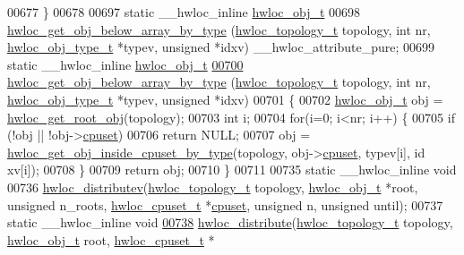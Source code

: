 \begin{DoxyCode}
00677 \}
00678 
00697 \textcolor{keyword}{static} \_\_hwloc\_inline \hyperlink{a00016}{hwloc_obj_t}
00698 \hyperlink{a00058_gac33a0990f4e771b2117ddedabc3f00f6}{hwloc_get_obj_below_array_by_type} (\hyperlink{a00039_ga9d1e76ee15a7dee158b786c30b6a6e38}{hwloc_topology_t} topology, \textcolor{keywordtype}{int} nr, 
      \hyperlink{a00041_gacd37bb612667dc437d66bfb175a8dc55}{hwloc_obj_type_t} *typev, \textcolor{keywordtype}{unsigned} *idxv) \_\_hwloc\_attribute\_pure;
00699 \textcolor{keyword}{static} \_\_hwloc\_inline \hyperlink{a00016}{hwloc_obj_t}
\hypertarget{a00031_source_l00700}{}\hyperlink{a00058_gac33a0990f4e771b2117ddedabc3f00f6}{00700} \hyperlink{a00058_gac33a0990f4e771b2117ddedabc3f00f6}{hwloc_get_obj_below_array_by_type} (\hyperlink{a00039_ga9d1e76ee15a7dee158b786c30b6a6e38}{hwloc_topology_t} topology, \textcolor{keywordtype}{int} nr, 
      \hyperlink{a00041_gacd37bb612667dc437d66bfb175a8dc55}{hwloc_obj_type_t} *typev, \textcolor{keywordtype}{unsigned} *idxv)
00701 \{
00702   \hyperlink{a00016}{hwloc_obj_t} obj = \hyperlink{a00053_gadbf58f6e187efbdb3cd9a8e30311b7d7}{hwloc_get_root_obj}(topology);
00703   \textcolor{keywordtype}{int} i;
00704   \textcolor{keywordflow}{for}(i=0; i<nr; i++) \{
00705     \textcolor{keywordflow}{if} (!obj || !obj->\hyperlink{a00016_a67925e0f2c47f50408fbdb9bddd0790f}{cpuset})
00706       \textcolor{keywordflow}{return} NULL;
00707     obj = \hyperlink{a00054_gaa8dcdb85224f7350b90fb0a1ca91e6d6}{hwloc_get_obj_inside_cpuset_by_type}(topology, obj->\hyperlink{a00016_a67925e0f2c47f50408fbdb9bddd0790f}{cpuset}, typev[i], id
      xv[i]);
00708   \}
00709   \textcolor{keywordflow}{return} obj;
00710 \}
00711 
00735 \textcolor{keyword}{static} \_\_hwloc\_inline \textcolor{keywordtype}{void}
00736 \hyperlink{a00059_gaf057d7c5e3cb3df897ce527258537619}{hwloc_distributev}(\hyperlink{a00039_ga9d1e76ee15a7dee158b786c30b6a6e38}{hwloc_topology_t} topology, \hyperlink{a00016}{hwloc_obj_t} *root, \textcolor{keywordtype}{unsigned} n\_roots,
       \hyperlink{a00040_ga4bbf39b68b6f568fb92739e7c0ea7801}{hwloc_cpuset_t} *\hyperlink{a00016_a67925e0f2c47f50408fbdb9bddd0790f}{cpuset}, \textcolor{keywordtype}{unsigned} n, \textcolor{keywordtype}{unsigned} until);
00737 \textcolor{keyword}{static} \_\_hwloc\_inline \textcolor{keywordtype}{void}
\hypertarget{a00031_source_l00738}{}\hyperlink{a00059_ga6d5c88292ad5aa062c1bebc99369c042}{00738} \hyperlink{a00059_ga6d5c88292ad5aa062c1bebc99369c042}{hwloc_distribute}(\hyperlink{a00039_ga9d1e76ee15a7dee158b786c30b6a6e38}{hwloc_topology_t} topology, \hyperlink{a00016}{hwloc_obj_t} root, \hyperlink{a00040_ga4bbf39b68b6f568fb92739e7c0ea7801}{hwloc_cpuset_t} *

\end{DoxyCode}
